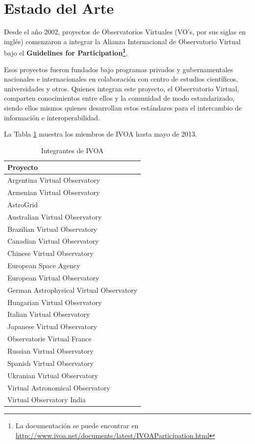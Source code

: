 \section{Estado del Arte}

Desde el año 2002, proyectos de Observatorios Virtuales (VO's, por sus siglas en inglés) comenzaron a integrar
la Alianza Internacional de Observatorio Virtual bajo el \textbf{Guidelines
for Participation\footnote{La documentación se puede
encontrar en \url{http://www.ivoa.net/documents/latest/IVOAParticipation.html}}}.

Esos proyectos fueron fundados bajo programas privados y gubernamentales nacionales e
internacionales en colaboración con centro de estudios científicos,
universidades y otros. Quienes integran este proyecto, el Observatorio Virtual, 
comparten conocimientos entre ellos y la comunidad de modo estandarizado, siendo
ellos mismos quienes desarrollan estos estándares para el intercambio de 
información e interoperabilidad.

La Tabla \ref{table:integrantes} muestra los miembros de IVOA hasta mayo de
2013.

\begin{table}[h!t]
	\centering
	\caption{Integrantes de IVOA}	
	\begin{tabular}{l} \hline
		\textbf{Proyecto} \\\hline
			Argentina Virtual Observatory \cite{arg} \\
			Armenian Virtual Observatory \cite{arm}\\
			AstroGrid \cite{astrogrid}\\
			Australian Virtual Observatory \cite{aus}\\
			Brazilian Virtual Observatory \cite{bra}\\
			Canadian Virtual Observatory \cite{can}\\
			Chinese Virtual Observatory \cite{china}\\
			European Space Agency \cite{esa}\\
			European Virtual Observatory \cite{euro}\\
			German Astrophysical Virtual Observatory \cite{ger}\\
			Hungarian Virtual Observatory \cite{hun}\\
			Italian Virtual Observatory \cite{ita}\\
			Japanese Virtual Observatory \cite{jap}\\
			Observatorie Virtual France \cite{fra}\\
			Russian Virtual Observatory \cite{rus}\\
			Spanish Virtual Observatory \cite{spa}\\
			Ukranian Virtual Observatory \cite{ukr}\\
			Virtual Astronomical Observatory \cite{usa}\\
			Virtual Observatory India \cite{ind}\\
            \hline
	\end{tabular}
	\label{table:integrantes}
\end{table}

